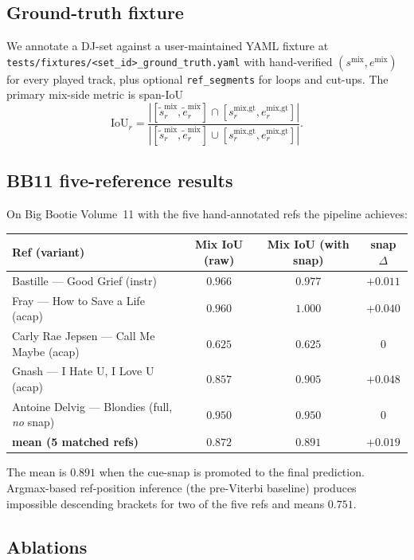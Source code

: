 \documentclass[11pt,a4paper]{article}
\begin{document}
\subsection{Ground-truth fixture}

We annotate a DJ-set against a user-maintained YAML fixture at \texttt{tests/fixtures/<set\_id>\_ground\_truth.yaml} with hand-verified $(s^{\text{mix}}, e^{\text{mix}})$ for every played track, plus optional \texttt{ref\_segments} for loops and cut-ups. The primary mix-side metric is span-IoU
\[
\text{IoU}_r = \frac{|[\tilde s^{\text{mix}}_r, \tilde e^{\text{mix}}_r] \cap [s^{\text{mix,gt}}_r, e^{\text{mix,gt}}_r]|}{|[\tilde s^{\text{mix}}_r, \tilde e^{\text{mix}}_r] \cup [s^{\text{mix,gt}}_r, e^{\text{mix,gt}}_r]|}.
\]

\subsection{BB11 five-reference results}

On Big Bootie Volume~11 with the five hand-annotated refs the pipeline achieves:

\begin{center}
\begin{tabular}{lccc}
\toprule
Ref (variant) & Mix IoU (raw) & Mix IoU (with snap) & snap $\Delta$ \\
\midrule
Bastille --- Good Grief (instr) & $0.966$ & $0.977$ & $+0.011$ \\
Fray --- How to Save a Life (acap) & $0.960$ & $1.000$ & $+0.040$ \\
Carly Rae Jepsen --- Call Me Maybe (acap) & $0.625$ & $0.625$ & $0$ \\
Gnash --- I Hate U, I Love U (acap) & $0.857$ & $0.905$ & $+0.048$ \\
Antoine Delvig --- Blondies (full, \emph{no} snap) & $0.950$ & $0.950$ & $0$ \\
\midrule
\textbf{mean (5 matched refs)} & $\mathbf{0.872}$ & $\mathbf{0.891}$ & $\mathbf{+0.019}$ \\
\bottomrule
\end{tabular}
\end{center}

The mean is $0.891$ when the cue-snap is promoted to the final prediction. Argmax-based ref-position inference (the pre-Viterbi baseline) produces impossible descending brackets for two of the five refs and means $0.751$.

\subsection{Ablations}
\end{document}
